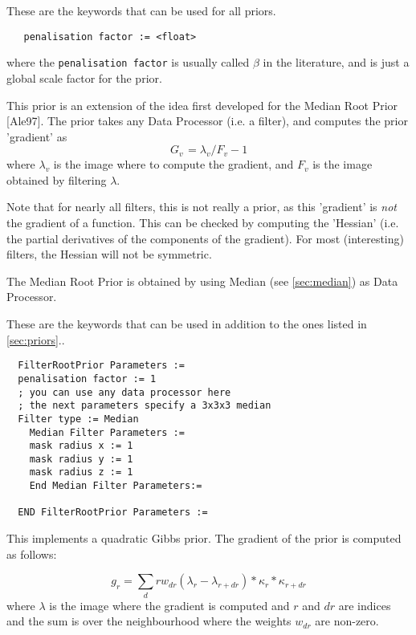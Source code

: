 \documentclass{article}
\begin{document}
{ 
}

These are the keywords that can be used for all priors.
  \begin{verbatim}
   penalisation factor := <float>
  \end{verbatim}
  \noindent where the \texttt{penalisation factor} is usually called
  $\beta$ in the literature, and is just a global scale factor for the
  prior.

{ 
}

This prior is an extension of the idea first developed for the 
Median Root Prior [Ale97]. The prior takes any Data Processor 
(i.e. a filter), and computes the prior 'gradient' as 
\[
G_{v\,} =\lambda _{v} /F_{v}  -1
\]
\noindent where 
$\lambda _{v} $
 is the image where to compute the gradient, and 
$F_{v} $ is the image obtained by filtering $\lambda $.

Note that for nearly all filters, this is not really a prior, as 
this 'gradient' is \textit{not} the gradient of a function. This can 
be checked by computing the 'Hessian' (i.e. the partial derivatives 
of the components of the gradient). For most (interesting) filters, 
the Hessian will not be symmetric.


The Median Root Prior is obtained by using Median (see \ref{sec:median}) 
as Data Processor.

{ 
}

These are the keywords that can be used in addition to the ones listed in \ref{sec:priors}..
  \begin{verbatim}
  FilterRootPrior Parameters :=
  penalisation factor := 1
  ; you can use any data processor here
  ; the next parameters specify a 3x3x3 median
  Filter type := Median
    Median Filter Parameters :=
    mask radius x := 1   
    mask radius y := 1
    mask radius z := 1
    End Median Filter Parameters:=

  END FilterRootPrior Parameters :=
 \end{verbatim}

{ 
}

This implements a quadratic Gibbs prior. The gradient of the prior is computed as follows:
  
 \[
  g_r = \sum_dr w_{dr} (\lambda_r - \lambda_{r+dr}) * \kappa_r * \kappa_{r+dr}
  \]
  \noindent where $\lambda$ is the image where the gradient is computed
   and $r$ and $dr$ are indices and the sum
  is over the neighbourhood where the weights $w_{dr}$ are non-zero.
\end{document}

